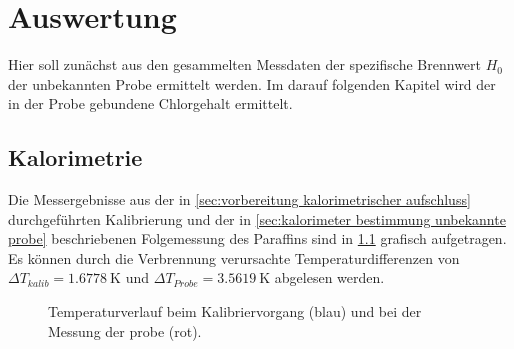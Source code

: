 \chapter{Auswertung}
	Hier soll zunächst aus den gesammelten Messdaten der spezifische Brennwert \(H_0\) der unbekannten Probe ermittelt werden. Im darauf folgenden
	Kapitel wird der in der Probe gebundene Chlorgehalt ermittelt.
	\section{Kalorimetrie}
		Die Messergebnisse aus der in \cref{sec:vorbereitung kalorimetrischer aufschluss} durchgeführten Kalibrierung und der in
		\cref{sec:kalorimeter bestimmung unbekannte probe} beschriebenen Folgemessung des Paraffins sind in \cref{fig:tempverlauf}
		grafisch aufgetragen. Es können durch die Verbrennung verursachte Temperaturdifferenzen von \(\Delta T_{kalib} = \SI{1,6778}{\kelvin}\) und
		\(\Delta T_{Probe} = \SI{3,5619}{\kelvin}\) abgelesen werden.
		\begin{figure}[h]
			\centering
			
			\caption[Temperaturverlauf der Kalibrierung und der Messung]{Temperaturverlauf beim Kalibriervorgang (blau) und bei der Messung der probe (rot).}
			\label{fig:tempverlauf}
		\end{figure}

